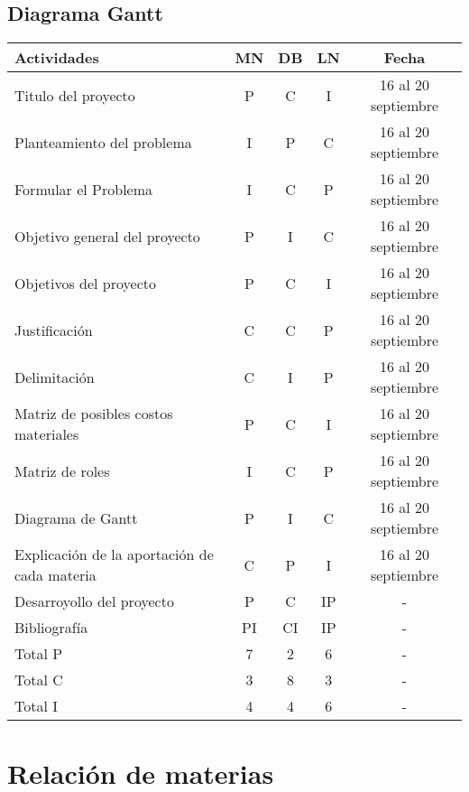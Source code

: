 \documentclass[letter,operight,12pt,spanish]{report}
\begin{document}
\subsection{Diagrama Gantt}

\begin{center}
\begin{tabular}{|l|c|c|c|c|}
\hline
	\textbf{Actividades} & \textbf{MN} & \textbf{DB} & \textbf{LN} & \textbf{Fecha}\\
\hline
	Titulo del proyecto & P & C & I & 16 al 20 septiembre\\
\hline
	Planteamiento del problema & I & P & C & 16 al 20 septiembre\\
\hline
	Formular el Problema & I & C & P & 16 al 20 septiembre\\
\hline
	Objetivo general del proyecto & P & I & C & 16 al 20 septiembre\\
\hline
	Objetivos del proyecto & P & C & I & 16 al 20 septiembre\\
\hline
	Justificaci\'on & C & C & P & 16 al 20 septiembre\\
\hline
	Delimitaci\'on & C & I & P & 16 al 20 septiembre\\
\hline
	Matriz de posibles costos materiales & P & C & I & 16 al 20 septiembre\\
\hline
	Matriz de roles & I & C & P & 16 al 20 septiembre\\
\hline
	Diagrama de Gantt & P & I & C & 16 al 20 septiembre\\
\hline
	Explicaci\'on de la aportaci\'on de cada materia & C & P & I & 16 al 20 septiembre\\
\hline
	Desarroyollo del proyecto & P & C & IP & -\\
\hline
	Bibliograf\'ia & PI & CI & IP & -\\
\hline
	Total P & 7 & 2 & 6 & -\\
\hline
	Total C & 3 & 8 & 3 & -\\
\hline
	Total I & 4 & 4 & 6 & -\\
\hline
\end{tabular}
\end{center}

\newpage

\section{Relaci\'on de materias}
\end{document}

